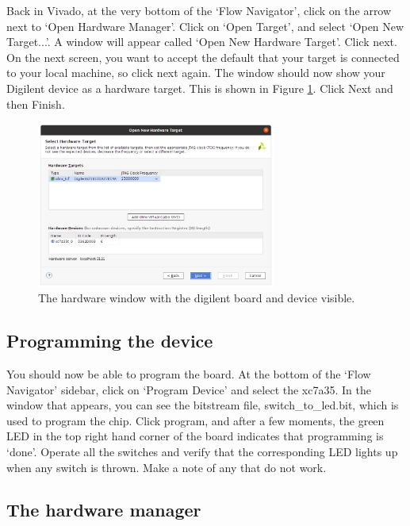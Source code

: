 \documentclass[../physical_computing.tex]{subfiles}
\begin{document}
Back in Vivado, at the very bottom of the `Flow Navigator', click on the arrow next to `Open Hardware Manager'. Click on `Open Target', and select `Open New Target...'. A window will appear called `Open New Hardware Target'. Click next. On the next screen, you want to accept the default that your target is connected to your local machine, so click next again. The window should now show your Digilent device as a hardware target. This is shown in Figure \ref{fig:hardware_target}. Click Next and then Finish.

\begin{figure}[htbp]
    \centering
    \includegraphics[width=0.7\textwidth]{chapter_1/figures/hardware_target.png}
    \caption{The hardware window with the digilent board and device visible.}
    \label{fig:hardware_target}
\end{figure}

\subsection{Programming the device}
\label{sec:programming}

You should now be able to program the board. At the bottom of the `Flow Navigator' sidebar, click on `Program Device' and select the xc7a35. In the window that appears, you can see the bitstream file, switch\_to\_led.bit, which is used to program the chip. Click program, and after a few moments, the green LED in the top right hand corner of the board indicates that programming is `done'. Operate all the switches and verify that the corresponding LED lights up when any switch is thrown. Make a note of any that do not work.

\subsection{The hardware manager}
\label{sec:hardware_manager}
\end{document}
